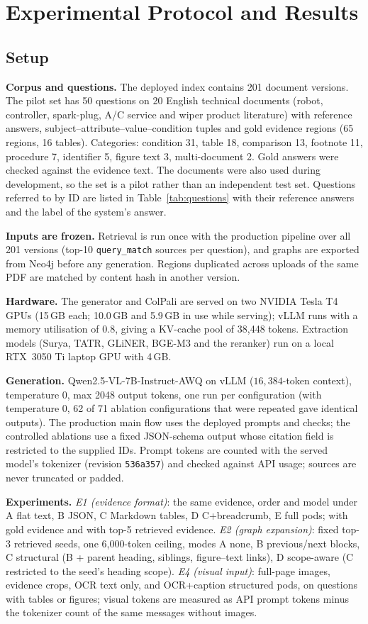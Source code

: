 \documentclass[conference]{IEEEtran}
\begin{document}
\section{Experimental Protocol and Results}
\subsection{Setup}
\textbf{Corpus and questions.} The deployed index contains 201 document versions. The pilot set has 50 questions on 20 English technical documents (robot, controller, spark-plug, A/C service and wiper product literature) with reference answers, subject--attribute--value--condition tuples and gold evidence regions (65 regions, 16 tables). Categories: condition 31, table 18, comparison 13, footnote 11, procedure 7, identifier 5, figure text 3, multi-document 2. Gold answers were checked against the evidence text. The documents were also used during development, so the set is a pilot rather than an independent test set. Questions referred to by ID are listed in Table~\ref{tab:questions} with their reference answers and the label of the system's answer.

\textbf{Inputs are frozen.} Retrieval is run once with the production pipeline over all 201 versions (top-10 \texttt{query\_match} sources per question), and graphs are exported from Neo4j before any generation. Regions duplicated across uploads of the same PDF are matched by content hash in another version.

\textbf{Hardware.} The generator and ColPali are served on two NVIDIA Tesla T4 GPUs (15\,GB each; 10.0\,GB and 5.9\,GB in use while serving); vLLM runs with a memory utilisation of 0.8, giving a KV-cache pool of 38{,}448 tokens. Extraction models (Surya, TATR, GLiNER, BGE-M3 and the reranker) run on a local RTX~3050 Ti laptop GPU with 4\,GB.

\textbf{Generation.} Qwen2.5-VL-7B-Instruct-AWQ on vLLM ($16{,}384$-token context), temperature 0, max 2048 output tokens, one run per configuration (with temperature 0, 62 of 71 ablation configurations that were repeated gave identical outputs). The production main flow uses the deployed prompts and checks; the controlled ablations use a fixed JSON-schema output whose citation field is restricted to the supplied IDs. Prompt tokens are counted with the served model's tokenizer (revision \texttt{536a357}) and checked against API usage; sources are never truncated or padded.

\textbf{Experiments.} \emph{E1 (evidence format)}: the same evidence, order and model under A flat text, B JSON, C Markdown tables, D C+breadcrumb, E full pods; with gold evidence and with top-5 retrieved evidence. \emph{E2 (graph expansion)}: fixed top-3 retrieved seeds, one 6{,}000-token ceiling, modes A none, B previous/next blocks, C structural (B + parent heading, siblings, figure--text links), D scope-aware (C restricted to the seed's heading scope). \emph{E4 (visual input)}: full-page images, evidence crops, OCR text only, and OCR+caption structured pods, on questions with tables or figures; visual tokens are measured as API prompt tokens minus the tokenizer count of the same messages without images.
\end{document}
